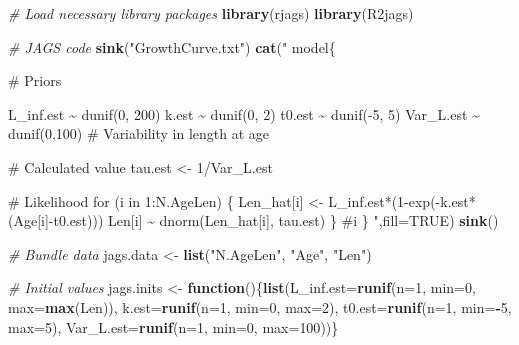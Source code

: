 \documentclass[
]{krantz}
\makeatletter
\newenvironment{Shaded}{\begin{snugshade}}{\end{snugshade}}
\newcommand{\AttributeTok}[1]{\textcolor[rgb]{0.27,0.27,0.27}{#1}}
\newcommand{\CommentTok}[1]{\textcolor[rgb]{0.37,0.37,0.37}{\textit{#1}}}
\newcommand{\ConstantTok}[1]{\textcolor[rgb]{0.37,0.37,0.37}{#1}}
\newcommand{\ControlFlowTok}[1]{\textcolor[rgb]{0.27,0.27,0.27}{\textbf{#1}}}
\newcommand{\DecValTok}[1]{\textcolor[rgb]{0.06,0.06,0.06}{#1}}
\newcommand{\FunctionTok}[1]{\textcolor[rgb]{0.27,0.27,0.27}{\textbf{#1}}}
\newcommand{\NormalTok}[1]{#1}
\newcommand{\OtherTok}[1]{\textcolor[rgb]{0.37,0.37,0.37}{#1}}
\newcommand{\SpecialCharTok}[1]{\textcolor[rgb]{0.43,0.43,0.43}{\textbf{#1}}}
\newcommand{\StringTok}[1]{\textcolor[rgb]{0.5,0.5,0.5}{#1}}
\newenvironment{kframe}{%
\medskip{}
\setlength{\fboxsep}{.8em}
 \def\at@end@of@kframe{}%
 \ifinner\ifhmode%
  \def\at@end@of@kframe{\end{minipage}}%
  \begin{minipage}{\columnwidth}%
 \fi\fi%
 \def\FrameCommand##1{\hskip\@totalleftmargin \hskip-\fboxsep
 \colorbox{shadecolor}{##1}\hskip-\fboxsep
     \hskip-\linewidth \hskip-\@totalleftmargin \hskip\columnwidth}%
 \MakeFramed {\advance\hsize-\width
   \@totalleftmargin\z@ \linewidth\hsize
   \@setminipage}}%
 {\par\unskip\endMakeFramed%
 \at@end@of@kframe}
\renewenvironment{Shaded}{\begin{kframe}}{\end{kframe}}
\makeatother
\begin{document}
\begin{Shaded}
\begin{Highlighting}[]
\CommentTok{\# Load necessary library packages}
\FunctionTok{library}\NormalTok{(rjags)}
\FunctionTok{library}\NormalTok{(R2jags)}

\CommentTok{\# JAGS code}
\FunctionTok{sink}\NormalTok{(}\StringTok{"GrowthCurve.txt"}\NormalTok{)}
\FunctionTok{cat}\NormalTok{(}\StringTok{"}
\StringTok{model\{}

\StringTok{\# Priors}

\StringTok{ L\_inf.est \textasciitilde{} dunif(0, 200)}
\StringTok{ k.est \textasciitilde{} dunif(0, 2)}
\StringTok{ t0.est \textasciitilde{} dunif({-}5, 5)}
\StringTok{ Var\_L.est \textasciitilde{} dunif(0,100)   \# Variability in length at age}

\StringTok{\# Calculated value}
\StringTok{ tau.est \textless{}{-} 1/Var\_L.est}

\StringTok{\# Likelihood}
\StringTok{ for (i in 1:N.AgeLen) \{}
\StringTok{    Len\_hat[i] \textless{}{-} L\_inf.est*(1{-}exp({-}k.est*(Age[i]{-}t0.est)))}
\StringTok{    Len[i] \textasciitilde{} dnorm(Len\_hat[i], tau.est)}
\StringTok{ \} \#i}
\StringTok{\}}
\StringTok{    "}\NormalTok{,}\AttributeTok{fill=}\ConstantTok{TRUE}\NormalTok{)}
\FunctionTok{sink}\NormalTok{()}

\CommentTok{\# Bundle data}
\NormalTok{jags.data }\OtherTok{\textless{}{-}} \FunctionTok{list}\NormalTok{(}\StringTok{"N.AgeLen"}\NormalTok{, }\StringTok{"Age"}\NormalTok{, }\StringTok{"Len"}\NormalTok{)}

\CommentTok{\# Initial values}
\NormalTok{jags.inits }\OtherTok{\textless{}{-}} \ControlFlowTok{function}\NormalTok{()\{}\FunctionTok{list}\NormalTok{(}\AttributeTok{L\_inf.est=}\FunctionTok{runif}\NormalTok{(}\AttributeTok{n=}\DecValTok{1}\NormalTok{, }\AttributeTok{min=}\DecValTok{0}\NormalTok{, }\AttributeTok{max=}\FunctionTok{max}\NormalTok{(Len)),}
                              \AttributeTok{k.est=}\FunctionTok{runif}\NormalTok{(}\AttributeTok{n=}\DecValTok{1}\NormalTok{, }\AttributeTok{min=}\DecValTok{0}\NormalTok{, }\AttributeTok{max=}\DecValTok{2}\NormalTok{),}
                              \AttributeTok{t0.est=}\FunctionTok{runif}\NormalTok{(}\AttributeTok{n=}\DecValTok{1}\NormalTok{, }\AttributeTok{min=}\SpecialCharTok{{-}}\DecValTok{5}\NormalTok{, }\AttributeTok{max=}\DecValTok{5}\NormalTok{),}
                              \AttributeTok{Var\_L.est=}\FunctionTok{runif}\NormalTok{(}\AttributeTok{n=}\DecValTok{1}\NormalTok{, }\AttributeTok{min=}\DecValTok{0}\NormalTok{, }\AttributeTok{max=}\DecValTok{100}\NormalTok{))\}}


\end{Highlighting}
\end{Shaded}
\end{document}
